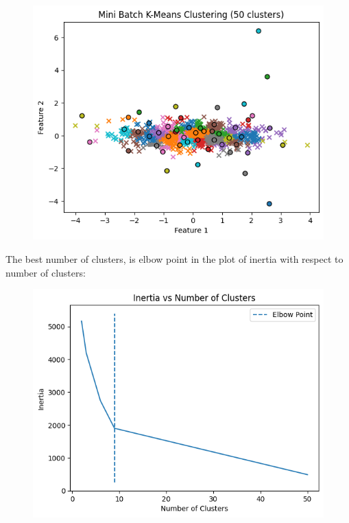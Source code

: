 \documentclass{template}
\begin{document}
\begin{figure}
\includegraphics[scale=0.7]{C5.png}
\caption{}
\label{fig:logo}
\end{figure}
The best number of clusters, is elbow point in the plot of inertia with respect to number of clusters:
\begin{figure}
\includegraphics[scale=0.7]{C6.png}
\caption{}
\label{fig:logo}
\end{figure}
\newpage
\end{document}
